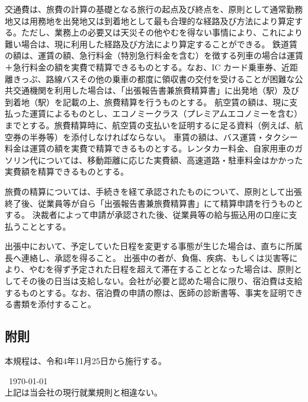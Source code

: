 \documentclass[10pt,a4paper,uplatex]{jsarticle}
\begin{document}
交通費は、旅費の計算の基礎となる旅行の起点及び終点を、原則として通常勤務地又は用務地を出発地又は到着地として最も合理的な経路及び方法により算定する。ただし、業務上の必要又は天災その他やむを得ない事情により、これにより難い場合は、現に利用した経路及び方法により算定することができる。
\term 鉄道賃の額は、運賃の額、急行料金（特別急行料金を含む）を徴する列車の場合は運賃＋急行料金の額を実費で精算できるものとする。なお、IC カード乗車券、近距離きっぷ、路線バスその他の乗車の都度に領収書の交付を受けることが困難な公共交通機関を利用した場合は、「出張報告書兼旅費精算書」に出発地（駅）及び到着地（駅）を記載の上、旅費精算を行うものとする。
\term 航空賃の額は、現に支払った運賃によるものとし、エコノミークラス（プレミアムエコノミーを含む）までとする。旅費精算時に、航空賃の支払いを証明するに足る資料（例えば、航空券の半券等）を添付しなければならない。
\term 車賃の額は、バス運賃・タクシー料金は運賃の額を実費で精算できるものとする。レンタカー料金、自家用車のガソリン代については、移動距離に応じた実費額、高速道路・駐車料金はかかった実費額を精算できるものとする。

旅費の精算については、手続きを経て承認されたものについて、原則として出張終了後、従業員等が自ら「出張報告書兼旅費精算書」にて精算申請を行うものとする。
\term 決裁者によって申請が承認された後、従業員等の給与振込用の口座に支払うこととする。

出張中において、予定していた日程を変更する事態が生じた場合は、直ちに所属長へ連絡し、承認を得ること。
\term 出張中の者が、負傷、疾病、もしくは災害等により、やむを得ず予定された日程を超えて滞在することとなった場合は、原則としてその後の日当は支給しない。会社が必要と認めた場合に限り、宿泊費は支給するものとする。なお、宿泊費の申請の際は、医師の診断書等、事実を証明できる書類を添付すること。

\subsection*{附則}
本規程は、令和4年11月25日から施行する。

\begin{flushleft}\
\today\\
\vspace{10pt}
上記は当会社の現行就業規則と相違ない。\\
\vspace{10pt}
\MakeSignatureField
\end{flushleft}
\end{document}

